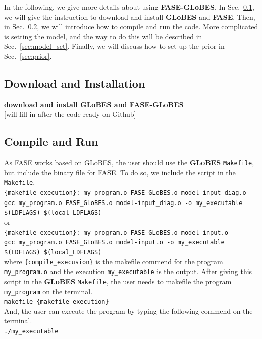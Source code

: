 \documentclass[a4paper,11pt]{article}
\begin{document}
In the following, we give more details about using \textbf{FASE-GLoBES}. In Sec.~\ref{sec:download}, we will give the instruction to download and install \textbf{GLoBES} and \textbf{FASE}. Then, in Sec.~\ref{sec:compile}, we will introduce how to compile and run the code. More complicated is setting the model, and the way to do this will be described in Sec.~\ref{sec:model_set}. Finally, we will discuss how to set up the prior in Sec.~\ref{sec:prior}.


\subsection{Download and Installation}\label{sec:download}
\textbf{download and install GLoBES and FASE-GLoBES}\\
{\color{red}[will fill in after the code ready on Github]}

\subsection{Compile and Run}\label{sec:compile}
As FASE works based on GLoBES, the user should use the \textbf{GLoBES} \texttt{Makefile}, but include the binary file for FASE. To do so, we include the script in the \texttt{Makefile},\vspace{0.2cm}\\
\texttt{\{makefile\_execution\}: my\_program.o  FASE\_GLoBES.o model-input\_diag.o\\
	gcc my\_program.o  FASE\_GLoBES.o model-input\_diag.o -o my\_executable  \$(LDFLAGS) \$(local\_LDFLAGS)}\\
or\\
\texttt{\{makefile\_execution\}: my\_program.o  FASE\_GLoBES.o model-input.o\\
	gcc my\_program.o  FASE\_GLoBES.o model-input.o -o my\_executable  \$(LDFLAGS) \$(local\_LDFLAGS)}\vspace{0.2cm}\\	
where \texttt{\{compile\_execusion\}} is the makefile commend for the program \texttt{my\_program.o} and the execution \texttt{my\_executable} is the output. After giving this script in the \textbf{GLoBES} \texttt{Makefile}, the user needs to makefile the program \texttt{my\_program} on the terminal.\vspace{0.2cm}\\
\texttt{makefile \{makefile\_execution\}}\vspace{0.2cm}\\
And, the user can execute the program by typing the following commend on the terminal.\vspace{0.2cm}\\ 
\texttt{./my\_executable}\vspace{0.2cm}\\
\end{document}
